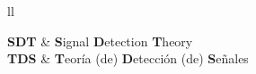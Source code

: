\documentclass[
11pt, %
spanish, %
singlespacing, %
headsepline, %
]{MastersDoctoralThesis} %
\begin{document}
\tableofcontents %

\listoffigures %

\listoftables %


\begin{abbreviations}{ll} %

\textbf{SDT} & \textbf{S}ignal \textbf{D}etection \textbf{T}heory\\
\textbf{TDS} & \textbf{T}eoría (de) \textbf{D}etección (de) \textbf{S}eñales\\

\end{abbreviations}








\end{document}

